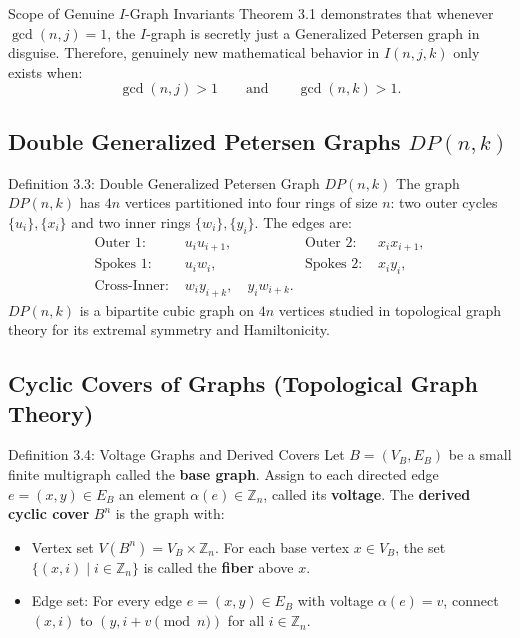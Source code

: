 \documentclass[11pt]{article}
\begin{document}
\begin{callbox}{Scope of Genuine $I$-Graph Invariants}
Theorem 3.1 demonstrates that whenever $\gcd(n,j)=1$, the $I$-graph is secretly just a Generalized Petersen graph in disguise. 
Therefore, genuinely new mathematical behavior in $I(n,j,k)$ only exists when:
\begin{equation}
  \gcd(n, j) > 1 \qquad \text{and} \qquad \gcd(n, k) > 1.
\end{equation}
\end{callbox}

\subsection{Double Generalized Petersen Graphs $DP(n,k)$}

\begin{defbox}{Definition 3.3: Double Generalized Petersen Graph $DP(n,k)$}
The graph $DP(n,k)$ has $4n$ vertices partitioned into four rings of size $n$: two outer cycles $\{u_i\}, \{x_i\}$ and two inner rings $\{w_i\}, \{y_i\}$. The edges are:
\begin{align}
  \text{Outer 1: } & u_i u_{i+1}, & \text{Outer 2: } & x_i x_{i+1}, \\
  \text{Spokes 1: } & u_i w_i, & \text{Spokes 2: } & x_i y_i, \\
  \text{Cross-Inner: } & w_i y_{i+k}, \quad y_i w_{i+k}.
\end{align}
$DP(n,k)$ is a bipartite cubic graph on $4n$ vertices studied in topological graph theory for its extremal symmetry and Hamiltonicity.
\end{defbox}

\subsection{Cyclic Covers of Graphs (Topological Graph Theory)}

\begin{defbox}{Definition 3.4: Voltage Graphs and Derived Covers}
Let $B = (V_B, E_B)$ be a small finite multigraph called the \textbf{base graph}. Assign to each directed edge $e = (x, y) \in E_B$ an element $\alpha(e) \in \mathbb{Z}_n$, called its \textbf{voltage}.
The \textbf{derived cyclic cover} $B^n$ is the graph with:
\begin{itemize}[leftmargin=*,nosep]
  \item Vertex set $V(B^n) = V_B \times \mathbb{Z}_n$. For each base vertex $x \in V_B$, the set $\{ (x, i) \mid i \in \mathbb{Z}_n \}$ is called the \textbf{fiber} above $x$.
  \item Edge set: For every edge $e = (x, y) \in E_B$ with voltage $\alpha(e) = v$, connect $(x, i)$ to $(y, i + v \pmod n)$ for all $i \in \mathbb{Z}_n$.
\end{itemize}
\end{defbox}
\end{document}
